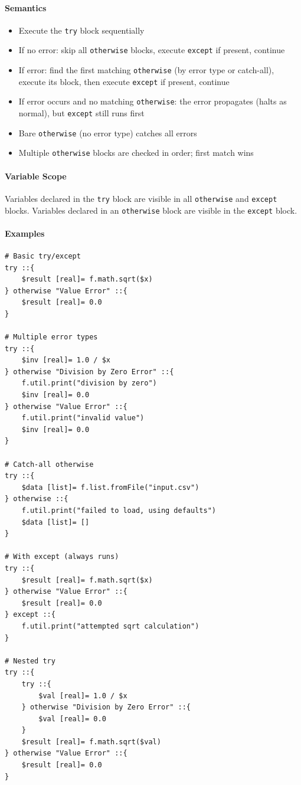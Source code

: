 \paragraph{Semantics}
\begin{itemize}
\item Execute the \texttt{try} block sequentially
\item If no error: skip all \texttt{otherwise} blocks, execute \texttt{except} if present, continue
\item If error: find the first matching \texttt{otherwise} (by error type or catch-all), execute its block, then execute \texttt{except} if present, continue
\item If error occurs and no matching \texttt{otherwise}: the error propagates (halts as normal), but \texttt{except} still runs first
\item Bare \texttt{otherwise} (no error type) catches all errors
\item Multiple \texttt{otherwise} blocks are checked in order; first match wins
\end{itemize}

\paragraph{Variable Scope}
Variables declared in the \texttt{try} block are visible in all \texttt{otherwise} and \texttt{except} blocks. Variables declared in an \texttt{otherwise} block are visible in the \texttt{except} block.

\paragraph{Examples}
\begin{verbatim}
# Basic try/except
try ::{
    $result [real]= f.math.sqrt($x)
} otherwise "Value Error" ::{
    $result [real]= 0.0
}

# Multiple error types
try ::{
    $inv [real]= 1.0 / $x
} otherwise "Division by Zero Error" ::{
    f.util.print("division by zero")
    $inv [real]= 0.0
} otherwise "Value Error" ::{
    f.util.print("invalid value")
    $inv [real]= 0.0
}

# Catch-all otherwise
try ::{
    $data [list]= f.list.fromFile("input.csv")
} otherwise ::{
    f.util.print("failed to load, using defaults")
    $data [list]= []
}

# With except (always runs)
try ::{
    $result [real]= f.math.sqrt($x)
} otherwise "Value Error" ::{
    $result [real]= 0.0
} except ::{
    f.util.print("attempted sqrt calculation")
}

# Nested try
try ::{
    try ::{
        $val [real]= 1.0 / $x
    } otherwise "Division by Zero Error" ::{
        $val [real]= 0.0
    }
    $result [real]= f.math.sqrt($val)
} otherwise "Value Error" ::{
    $result [real]= 0.0
}
\end{verbatim}

